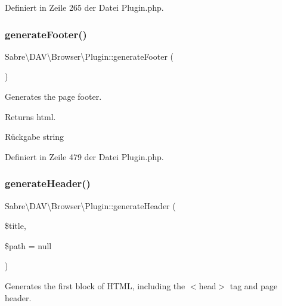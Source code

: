 Definiert in Zeile 265 der Datei Plugin.\+php.

\mbox{\label{class_sabre_1_1_d_a_v_1_1_browser_1_1_plugin_a235b4c30e3784049ad9bb90c9a743472}} 
\subsubsection{\texorpdfstring{generate\+Footer()}{generateFooter()}}
{\footnotesize\ttfamily Sabre\textbackslash{}\+D\+A\+V\textbackslash{}\+Browser\textbackslash{}\+Plugin\+::generate\+Footer (\begin{DoxyParamCaption}{ }\end{DoxyParamCaption})}

Generates the page footer.

Returns html.

\begin{DoxyReturn}{Rückgabe}
string 
\end{DoxyReturn}


Definiert in Zeile 479 der Datei Plugin.\+php.

\mbox{\label{class_sabre_1_1_d_a_v_1_1_browser_1_1_plugin_a79e35f5de30bba3e885cee275960f4f1}} 
\subsubsection{\texorpdfstring{generate\+Header()}{generateHeader()}}
{\footnotesize\ttfamily Sabre\textbackslash{}\+D\+A\+V\textbackslash{}\+Browser\textbackslash{}\+Plugin\+::generate\+Header (\begin{DoxyParamCaption}\item[{}]{\$title,  }\item[{}]{\$path = {\ttfamily null} }\end{DoxyParamCaption})}

Generates the first block of H\+T\+ML, including the $<$head$>$ tag and page header.

